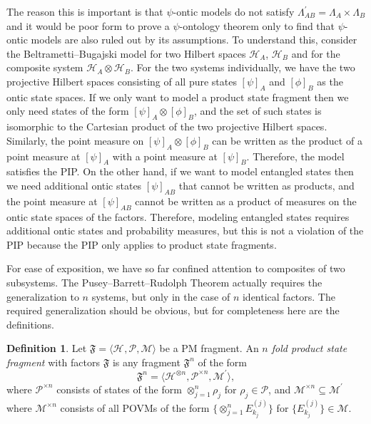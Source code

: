 \documentclass[DIV=calc,paper=a4,fontsize=11pt,twocolumn]{scrartcl} %
\theoremstyle{definition}
\newtheorem{definition}{Definition}[section]
\theoremstyle{plain}
\newcommand{\Proj}[1]{\ensuremath{\left [ #1 \right ]}}
\newcommand{\Hilb}[1][]{\ensuremath{\mathcal{H}_{#1}}}
\begin{document}
The reason this is important is that $\psi$-ontic models do not
satisfy $\Lambda^{\prime}_{AB} = \Lambda_A \times \Lambda_B$ and it
would be poor form to prove a $\psi$-ontology theorem only to find
that $\psi$-ontic models are also ruled out by its assumptions.  To
understand this, consider the Beltrametti--Bugajski model for two
Hilbert spaces $\Hilb[A]$, $\Hilb[B]$ and for the composite system
$\Hilb[A] \otimes \Hilb[B]$.  For the two systems individually, we
have the two projective Hilbert spaces consisting of all pure states
$\Proj{\psi}_A$ and $\Proj{\phi}_B$ as the ontic state spaces.  If we
only want to model a product state fragment then we only need states
of the form $\Proj{\psi}_A \otimes \Proj{\phi}_B$, and the set of such
states is isomorphic to the Cartesian product of the two projective
Hilbert spaces.  Similarly, the point measure on $\Proj{\psi}_A
\otimes \Proj{\phi}_B$ can be written as the product of a point
measure at $\Proj{\psi}_A$ with a point measure at $\Proj{\psi}_B$.
Therefore, the model satisfies the PIP\@.  On the other hand, if we
want to model entangled states then we need additional ontic states
$\Proj{\psi}_{AB}$ that cannot be written as products, and the point
measure at $\Proj{\psi}_{AB}$ cannot be written as a product of
measures on the ontic state spaces of the factors.  Therefore,
modeling entangled states requires additional ontic states and
probability measures, but this is not a violation of the PIP because
the PIP only applies to product state fragments.

For ease of exposition, we have so far confined attention to
composites of two subsystems.  The Pusey--Barrett--Rudolph Theorem actually requires the
generalization to $n$ systems, but only in the case of $n$ identical
factors.  The required generalization should be obvious, but for
completeness here are the definitions.

\begin{definition}
Let $\mathfrak{F} = \langle \Hilb, \mathcal{P}, \mathcal{M} \rangle$
be a PM fragment.  An \emph{$n$ fold product state fragment} with
factors $\mathfrak{F}$ is any fragment $\mathfrak{F}^n$ of the form
\begin{equation}
\mathfrak{F}^n = \langle \Hilb^{\otimes n},
\mathcal{P}^{\times n}, \mathcal{M}^{\prime} \rangle,
\end{equation}
where $\mathcal{P}^{\times n}$ consists of states of the form
$\otimes_{j=1}^n \rho_j$ for $\rho_j \in \mathcal{P}$, and
$\mathcal{M}^{\times n} \subseteq \mathcal{M}^{\prime}$ where
$\mathcal{M}^{\times n}$ consists of all POVMs of the form
$\{\otimes_{j=1}^n E^{(j)}_{k_j}\}$ for $\{E^{(j)}_{k_j}\} \in
\mathcal{M}$.
\end{definition}
\end{document}
